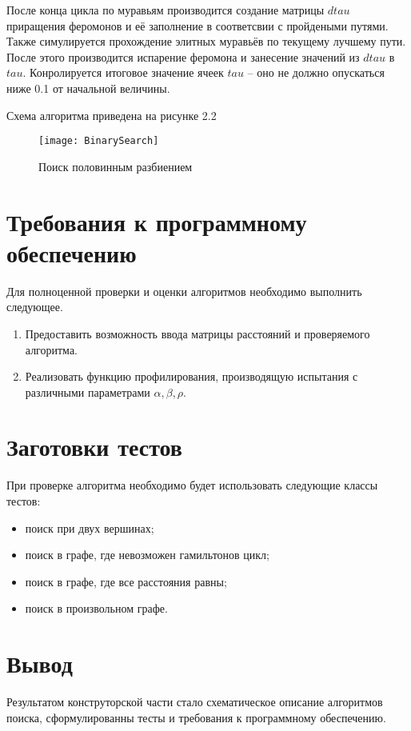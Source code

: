 После конца цикла по муравьям производится создание матрицы $dtau$ приращения феромонов и её заполнение в соответсвии с пройдеными путями. Также симулируется прохождение элитных муравьёв по текущему лучшему пути. После этого производится испарение феромона и занесение значений из $dtau$ в $tau$. Конролируется итоговое значение ячеек $tau$ -- оно не должно опускаться ниже 0.1 от начальной величины.

Схема алгоритма приведена на рисунке 2.2
\begin{figure}[h]
	\begin{center}
		{\texttt{[image: BinarySearch]}}
		\caption{Поиск половинным разбиением}
	\end{center}
\end{figure}


\section{Требования к программному обеспечению}
Для полноценной проверки и оценки алгоритмов необходимо выполнить следующее.
\begin{enumerate}
	\item Предоставить возможность ввода матрицы расстояний и проверяемого алгоритма.
	\item Реализовать функцию профилирования, производящую испытания с различными параметрами $\alpha, \beta, \rho$.
\end{enumerate}


\section{Заготовки тестов}
При проверке алгоритма необходимо будет использовать следующие классы тестов:
\begin{itemize}
	\item поиск при двух вершинах;
	\item поиск в графе, где невозможен гамильтонов цикл;
	\item поиск в графе, где все расстояния равны;
	\item поиск в произвольном графе.
\end{itemize}

\section*{Вывод}
Результатом конструторской части стало схематическое описание алгоритмов поиска, сформулированны тесты и требования к программному обеспечению.


